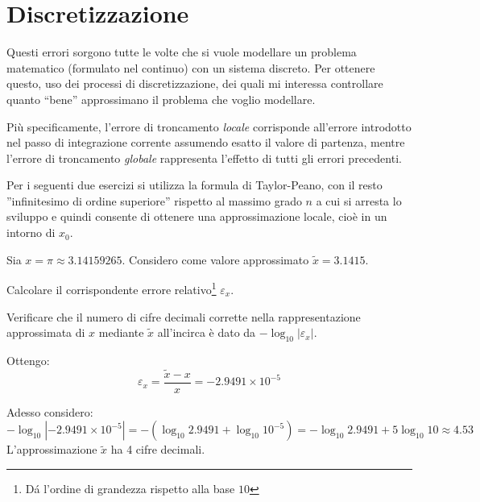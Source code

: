 \section{Discretizzazione} 

Questi errori sorgono tutte le volte che si vuole modellare un problema 
matematico (formulato nel continuo) con un sistema discreto. Per ottenere 
questo, uso dei processi di discretizzazione, dei quali mi interessa controllare
quanto ``bene'' approssimano il problema che voglio modellare.

Pi\`u specificamente, l'errore di troncamento \emph{locale} corrisponde 
all'errore introdotto nel passo di integrazione corrente assumendo esatto il 
valore di partenza, mentre l'errore di troncamento \emph{globale} rappresenta 
l'effetto di tutti gli errori precedenti.

Per i seguenti due esercizi si utilizza la formula di Taylor-Peano, con il 
resto ''infinitesimo di ordine superiore'' rispetto al massimo grado $n$ a cui 
si arresta lo sviluppo e quindi consente di ottenere una approssimazione
locale, cio\`e in un intorno di $x_{0}$.

\begin{exercise}[1.1]
	Sia $x = \pi \approx 3.14159265$. Considero come valore approssimato 
	$\tilde{x} = 3.1415$. 
	
	Calcolare il corrispondente errore relativo\footnote{D\'a l'ordine di 
	grandezza rispetto alla base $10$} $\varepsilon_{x}$. 
	
	Verificare che il numero di cifre decimali corrette nella rappresentazione 
	approssimata di $x$ mediante $\tilde{x}$ all'incirca \`e dato da $-\log_{10}
	{|\varepsilon_{x}|}$.
\end{exercise}
Ottengo:
\begin{displaymath}
	\varepsilon_{x} = \frac{\tilde{x}-x}{x} = -2.9491 \times 10^{-5}
\end{displaymath}

Adesso considero:
\begin{equation*}
	-\log_{10}{|-2.9491 \times 10^{-5}|} = -\left (\log_{10}{2.9491} +
	\log_{10}{10^{-5}} \right ) = -\log_{10}{2.9491} + 5\log_{10}{10} \approx 4.53
\end{equation*}
L'approssimazione $\tilde{x}$ ha 4 cifre decimali.


